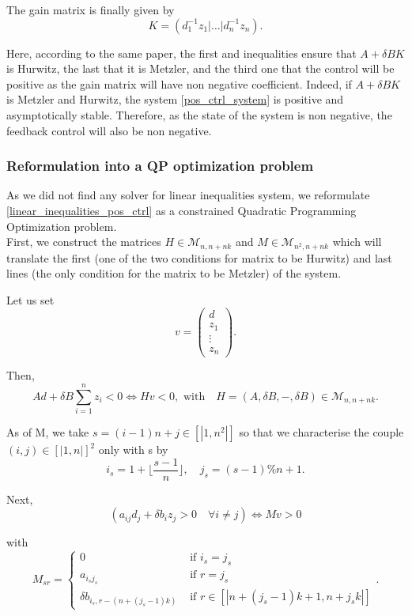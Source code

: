 \documentclass[12pt]{article}
\begin{document}
The gain matrix is finally given by 
\begin{equation}
\boxed{
    K = (d_1^{-1}z_1| \dots |d_n^{-1}z_n).
}
\end{equation}

Here, according to the same paper, the first and inequalities ensure that $A+\delta BK$ is Hurwitz, the last that it is Metzler, and the third one that the control will be positive as the gain matrix will have non negative coefficient. Indeed, if $A+\delta BK$ is Metzler and Hurwitz, the system \eqref{pos_ctrl_system} is positive and asymptotically stable. Therefore, as the state of the system is non negative, the feedback control will also be non negative. 

\subsubsection{Reformulation into a QP optimization problem}
As we did not find any solver for linear inequalities system, we reformulate  \eqref{linear_inequalities_pos_ctrl} as a constrained Quadratic Programming Optimization problem.
\\

First, we construct the matrices $H \in \mathcal{M}_{n,n+nk}$ and $M \in \mathcal{M}_{n^2,n+nk}$ which will translate the first (one of the two conditions for matrix to be Hurwitz) and last lines (the only condition for the matrix to be Metzler) of the system. 

 Let us set $$v=\begin{pmatrix}d\\ z_1 \\ \vdots \\ z_n
\end{pmatrix}.$$

Then, 
$$Ad + \delta B\sum_{i=1}^n z_i <0 \Leftrightarrow H
v
<0, \text{ with} \quad H = (A,\delta B,-,\delta B) \in \mathcal{M}_{n,n+nk}.$$

As of M, we take $s = (i-1)n + j \in [|1,n^2|]$ so that we characterise the couple $(i,j) \in [|1,n|]^2$ only with s by
$$i_s = 1+\lfloor\frac{s-1}{n}\rfloor, \quad j_s=(s-1)\%n+1.$$

Next, $$(a_{ij}d_j+\delta b_iz_j >0 \quad \forall i \neq j )\Leftrightarrow Mv > 0$$

with
$$M_{sr} = 
\left\{ \begin{aligned}
0 &\text{ if } i_s=j_s \\
a_{i_s j_s} &\text{ if } r=j_s\\
\delta b_{i_s,r-(n+(j_s-1)k)} &\text{ if } r\in [|n+(j_s-1)k+1, n+j_sk|]
\end{aligned}\right. .$$
\\
\end{document}
